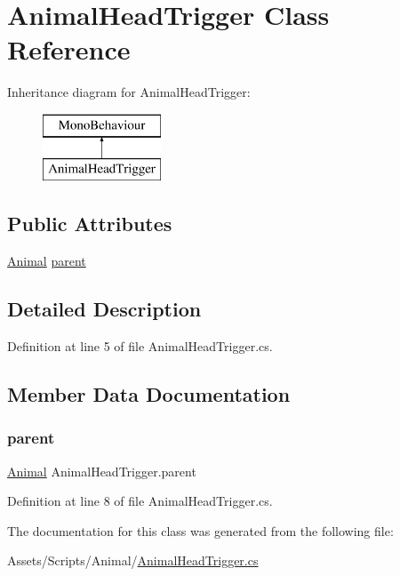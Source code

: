 \hypertarget{class_animal_head_trigger}{}\section{Animal\+Head\+Trigger Class Reference}
\label{class_animal_head_trigger}
Inheritance diagram for Animal\+Head\+Trigger\+:\begin{figure}[H]
\begin{center}
\leavevmode
\includegraphics[height=2.000000cm]{class_animal_head_trigger}
\end{center}
\end{figure}
\subsection*{Public Attributes}
\begin{DoxyCompactItemize}
\item 
\mbox{\hyperlink{class_animal}{Animal}} \mbox{\hyperlink{class_animal_head_trigger_a1edf006124e6e1a393b4d33ca32a5d64}{parent}}
\end{DoxyCompactItemize}


\subsection{Detailed Description}


Definition at line 5 of file Animal\+Head\+Trigger.\+cs.



\subsection{Member Data Documentation}
\mbox{\label{class_animal_head_trigger_a1edf006124e6e1a393b4d33ca32a5d64}} 
\subsubsection{\texorpdfstring{parent}{parent}}
{\footnotesize\ttfamily \mbox{\hyperlink{class_animal}{Animal}} Animal\+Head\+Trigger.\+parent}



Definition at line 8 of file Animal\+Head\+Trigger.\+cs.



The documentation for this class was generated from the following file\+:\begin{DoxyCompactItemize}
\item 
Assets/\+Scripts/\+Animal/\mbox{\hyperlink{_animal_head_trigger_8cs}{Animal\+Head\+Trigger.\+cs}}\end{DoxyCompactItemize}
